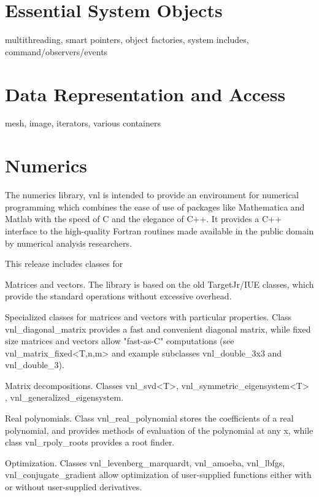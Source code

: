 \section{Essential System Objects}
\label{sec:EssentialSystemObjects}

	multithreading, smart pointers, object factories, system includes,
	command/observers/events

\section{Data Representation and Access}
\label{sec:DataRepresentationAndAccess}

	mesh, image, iterators, various containers

\section{Numerics}
\label{sec:Numerics}

The numerics library, vnl is intended to provide an environment for numerical
programming which combines the ease of use of packages like Mathematica and
Matlab with the speed of C and the elegance of C++. It provides a C++
interface to the high-quality Fortran routines made available in the public
domain by numerical analysis researchers.

This release includes classes for 

Matrices and vectors. The library is based on the old TargetJr/IUE classes, which provide the standard operations without excessive overhead. 

Specialized classes for matrices and vectors with particular properties. Class vnl_diagonal_matrix provides a fast and convenient diagonal matrix, while fixed size matrices and vectors allow "fast-as-C" computations (see vnl_matrix_fixed<T,n,m> and example subclasses vnl_double_3x3 and vnl_double_3). 

Matrix decompositions. Classes vnl_svd<T>, vnl_symmetric_eigensystem<T> , vnl_generalized_eigensystem. 

Real polynomials. Class vnl_real_polynomial stores the coefficients of a real polynomial, and provides methods of evaluation of the polynomial at any x, while class vnl_rpoly_roots provides a root finder. 

Optimization. Classes vnl_levenberg_marquardt, vnl_amoeba, vnl_lbfgs, vnl_conjugate_gradient allow optimization of user-supplied functions either with or without user-supplied derivatives. 

